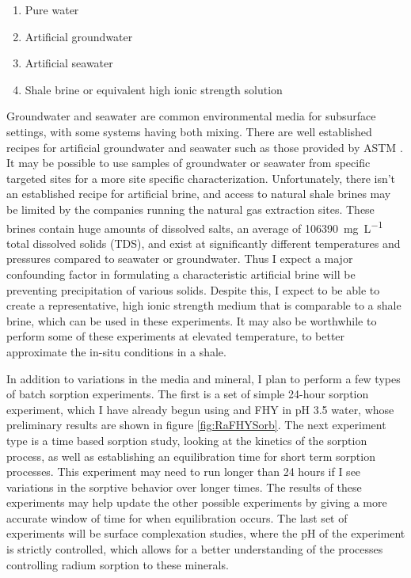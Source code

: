 \documentclass[twoside,12pt,titlepage]{article}
\newcommand{\isotope}[2]{\ch{^{#1}#2}}
\begin{document}
\begin{enumerate}[label = \roman*)]
	\item Pure water
	\item Artificial groundwater
	\item Artificial seawater
	\item Shale brine or equivalent high ionic strength solution
\end{enumerate}

Groundwater and seawater are common environmental media for subsurface settings, with some systems having both mixing. There are well established recipes for artificial groundwater and seawater such as those provided by ASTM \cite{ASTMSeawater2013}. It may be possible to use samples of groundwater or seawater from specific targeted sites for a more site specific characterization. Unfortunately, there isn't an established recipe for artificial brine, and access to natural shale brines may be limited by the companies running the natural gas extraction sites. These brines contain huge amounts of dissolved salts, an average of \SI{106390}{\milli\gram\per\liter} total dissolved solids (TDS), and exist at significantly different temperatures and pressures compared to seawater or groundwater. Thus I expect a major confounding factor in formulating a characteristic artificial brine will be preventing precipitation of various solids. Despite this, I expect to be able to create a representative, high ionic strength medium that is comparable to a shale brine, which can be used in these experiments. It may also be worthwhile to perform some of these experiments at elevated temperature, to better approximate the in-situ conditions in a shale.

\par In addition to variations in the media and mineral, I plan to perform a few types of batch sorption experiments. The first is a set of simple 24-hour sorption experiment, which I have already begun using \isotope{226}{Ra} and FHY in pH \num{3.5} water, whose preliminary results are shown in figure \ref{fig:RaFHYSorb}. The next experiment type is a time based sorption study, looking at the kinetics of the sorption process, as well as establishing an equilibration time for short term sorption processes. This experiment may need to run longer than 24 hours if I see variations in the sorptive behavior over longer times. The results of these experiments may help update the other possible experiments by giving a more accurate window of time for when equilibration occurs. The last set of experiments will be surface complexation studies, where the pH of the experiment is strictly controlled, which allows for a better understanding of the processes controlling radium sorption to these minerals.
\end{document}

